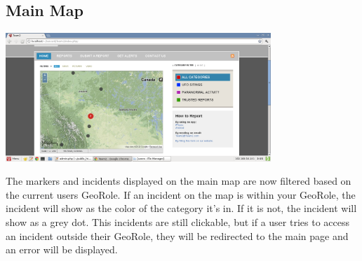 \documentclass{article}
\begin{document}
\subsection{Main Map}
\begin{minipage}{\linewidth}
  \centering
  \includegraphics[width=100mm]{mainmapscreen.png}
\end{minipage}
The markers and incidents displayed on the main map are now filtered based on the current users GeoRole. If an incident on the map is within your GeoRole, the incident will show as the color of the category it's in. If it is not, the incident will show as a grey dot.  This incidents are still clickable, but if a user tries to access an incident outside their GeoRole, they will be redirected to the main page and an error will be displayed. 
\end{document}
